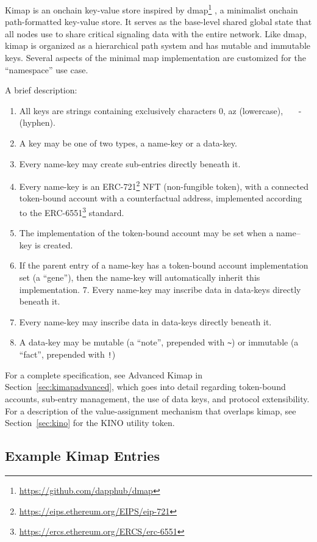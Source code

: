 \documentclass[runningheads]{llncs}
\begin{document}
Kimap is an onchain key-value store inspired by dmap\footnote{\url{https://github.com/dapphub/dmap}}
, a minimalist onchain path-formatted key-value store.
It serves as the base-level shared global state that all nodes use to share critical signaling data with the entire network.
Like dmap, kimap is organized as a hierarchical path system and has mutable and immutable keys.
Several aspects of the minimal map implementation are customized for the ``namespace'' use case.

A brief description:

\begin{enumerate}
    \item All keys are strings containing exclusively characters 0, a\textendash z (lowercase),    - (hyphen).
    \item A key may be one of two types, a name-key or a data-key.
    \item Every name-key may create sub-entries directly beneath it.
    \item Every name-key is an ERC-721\footnote{\url{https://eips.ethereum.org/EIPS/eip-721}} NFT (non-fungible token), with a connected token-bound account with a counterfactual address, implemented according to the ERC-6551\footnote{\url{https://ercs.ethereum.org/ERCS/erc-6551}} standard.
    \item The implementation of the token-bound account may be set when a name–key is created.
    \item If the parent entry of a name-key has a token-bound account implementation set (a ``gene''), then the name-key will automatically inherit this implementation.
    7. Every name-key may inscribe data in data-keys directly beneath it.
    \item Every name-key may inscribe data in data-keys directly beneath it.
    \item A data-key may be mutable (a ``note'', prepended with \verb|~|) or immutable (a ``fact'', prepended with \verb|!|)
\end{enumerate}

For a complete specification, see Advanced Kimap in Section~\ref{sec:kimapadvanced}, which goes into detail regarding token-bound accounts, sub-entry management, the use of data keys, and protocol extensibility.
For a description of the value-assignment mechanism that overlaps kimap, see Section~\ref{sec:kino} for the KINO utility token.

\subsection{Example Kimap Entries}
\end{document}
